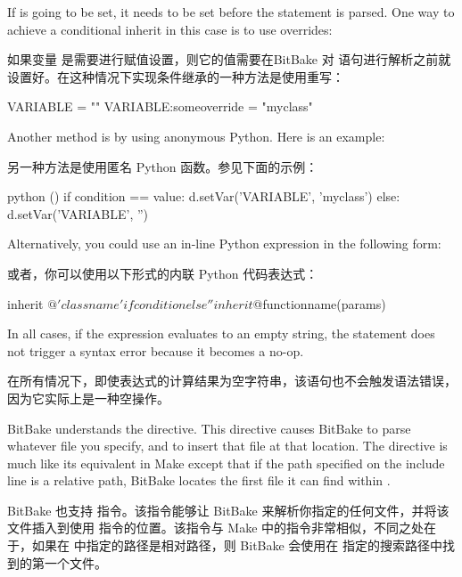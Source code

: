 If  is going to be set, it needs to be set before the  statement is parsed. One way to achieve a conditional inherit in this case is to use overrides:

如果变量  是需要进行赋值设置，则它的值需要在BitBake 对  语句进行解析之前就设置好。在这种情况下实现条件继承的一种方法是使用重写：

\begin{pyglist}
VARIABLE = ""
VARIABLE:someoverride = "myclass"
\end{pyglist}

Another method is by using anonymous Python. Here is an example:

另一种方法是使用匿名 Python 函数。参见下面的示例：
\begin{pyglist}
python () {
    if condition == value:
        d.setVar('VARIABLE', 'myclass')
    else:
        d.setVar('VARIABLE', '')
}
\end{pyglist}

Alternatively, you could use an in-line Python expression in the following form:

或者，你可以使用以下形式的内联 Python 代码表达式：

\begin{pyglist}
inherit ${@'classname' if condition else ''}
inherit ${@functionname(params)}
\end{pyglist}

In all cases, if the expression evaluates to an empty string, the statement does not trigger a syntax error because it becomes a no-op.

在所有情况下，即使表达式的计算结果为空字符串，该语句也不会触发语法错误，因为它实际上是一种空操作。

\label{section:include}

BitBake understands the  directive. This directive causes BitBake to parse whatever file you specify, and to insert that file at that location. The directive is much like its equivalent in Make except that if the path specified on the include line is a relative path, BitBake locates the first file it can find within .

BitBake 也支持  指令。该指令能够让 BitBake 来解析你指定的任何文件，并将该文件插入到使用  指令的位置。该指令与 Make 中的指令非常相似，不同之处在于，如果在  中指定的路径是相对路径，则 BitBake 会使用在  指定的搜索路径中找到的第一个文件。

